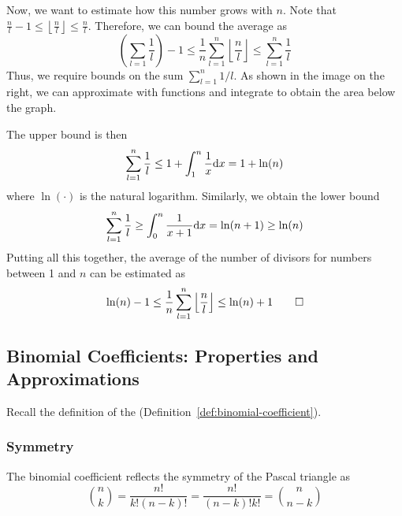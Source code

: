 \begin{example}
Now, we want to estimate how this number grows with $n$.
Note that
$
\frac{n}{l}-1 \leq\left\lfloor\frac{n}{l}\right\rfloor \leq \frac{n}{l}
$.
Therefore, we can bound the average as
$$
\left(\sum_{l=1} \frac{1}{l}\right)-1 \leq \frac{1}{n} \sum_{l=1}^n\left\lfloor\frac{n}{l}\right\rfloor \leq \sum_{l=1}^n \frac{1}{l}
$$
Thus, we require bounds on the sum $\sum_{l=1}^n 1 / l$. As shown in the image on the right, we can approximate with functions and integrate to obtain the area below the graph.

The upper bound is then
$$
\sum_{l=1}^n \frac{1}{l} \leq 1+\int_1^n \frac{1}{x} \mathrm{d} x=1+\ln (n)
$$
where $\ln(\cdot)$ is the natural logarithm. Similarly, we obtain the lower bound
$$
\sum_{l=1}^n \frac{1}{l} \geq \int_0^n \frac{1}{x+1} \mathrm{d} x=\ln (n+1) \geq \ln (n)
$$
Putting all this together, the average of the number of divisors for numbers between 1 and $n$ can be estimated as
\[
\ln (n)-1 \leq \frac{1}{n} \sum_{l=1}^n\left\lfloor\frac{n}{l}\right\rfloor \leq \ln (n)+1 \qedhere
\]
\end{example}





\subsection{Binomial Coefficients: Properties and Approximations}
\label{subsec:binom-properties}

Recall the definition of the  (Definition~\ref{def:binomial-coefficient}).

\subsubsection{Symmetry}
\label{subsubsec:binom-symmetry}
The binomial coefficient reflects the symmetry of the Pascal triangle as
\begin{equation}\label{eq:binom-symmetry}
  \binom{n}{k} = \frac{n!}{k!(n-k)!} = \frac{n!}{(n-k)!k!} = \binom{n}{n-k}
\end{equation}


